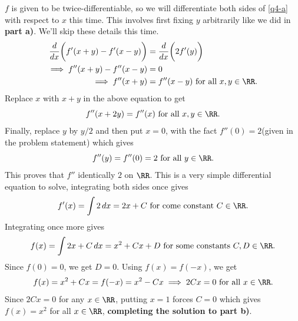 \documentclass[numbers=endperiod, 11pt]{scrartcl}
\begin{document}
\begin{sol}
    $f$ is given to be twice-differentiable, so we will
    differentiate both sides of \eqref{q4-a} with respect
    to $x$ this	time. This involves first fixing $y$
    arbitrarily like we did in \textbf{part a)}. We'll
    skip these details this time.
    \begin{align*}
        \frac{d}{dx} \bigg(f'(x+y) - f'(x-y)\bigg) & = \frac{d}{dx} \bigg( 2f'(y) \bigg)          \\
        \implies f''(x+y) - f''(x-y)               & = 0                                          \\
        \implies f''(x+y)                          & = f''(x-y) \,\,\text{for all $x,y \in \RR$.}
    \end{align*}
    Replace $x$ with $x+y$ in the above equation to get
    \[ f''(x+2y) = f''(x) \,\,\text{for all $x,y \in \RR$.}\]
    Finally, replace $y$ by $y/2$ and then put $x = 0$,
    with the fact $f''(0) = 2$(given in the problem
    statement) which gives
    \[ f''(y) = f''(0) = 2 \,\,\text{for all $y \in \RR$.}\]
    This proves that $f''$ identically $2$ on $\RR$.
    This is a very simple differential equation to solve,
    integrating both sides once gives
    \[ f'(x) = \int 2\, dx = 2x + C \,\,\text{for come constant $C \in \RR$.}\]
    Integrating once more gives
    \[f(x) = \int 2x + C \, dx = x^2 + Cx + D \,\, \text{for some constants $C,D \in \RR$.} \]
    Since $f(0) = 0$, we get $D = 0$. Using $f(x) = f(-x)$,
    we get
    \[ f(x) = x^2 + Cx = f(-x) = x^2 - Cx \implies 2Cx = 0 \,\,\text{for all $x \in \RR$.} \]
    Since $2Cx = 0$ for any $x \in \RR$, putting $x = 1$
    forces $C = 0$ which gives $f(x) = x^2$ for all
    $x \in \RR$, \textbf{completing the solution to part b)}.
\end{sol}
\newpage
\end{document}
